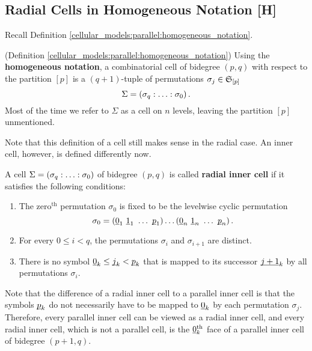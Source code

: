 \subsection{Radial Cells in Homogeneous Notation [H]}
\label{cellular_models:radial:cells_in_homogenous_notation}
Recall Definition \ref{cellular_models:parallel:homogeneous_notation}.

\begin{defi}(Definition \ref{cellular_models:parallel:homogeneous_notation})
\label{cellular_models:radial:homogeneous_notation}
Using the {\bf homogeneous notation}, a combinatorial cell of bidegree $(p,q)$ with respect to the partition $[p]$ is a $(q+1)$-tuple of permutations $\sigma_j \in \mathfrak S_{[p]}$
    \[
        \Sigma = \homogq \,.
    \]
    Most of the time we refer to $\Sigma$ as a cell on $n$ levels, leaving the partition $[p]$ unmentioned.
\end{defi}

Note that this definition of a cell still makes sense in the radial case.
An inner cell, however, is defined differently now.

\begin{defi}
\label{cellular_models:radial:inner_cells}
    A cell $\Sigma = \homogq$ of bidegree $(p,q)$ is called {\bf radial inner cell} if it satisfies the following conditions:
    \begin{enumerate}
        \item The zero${}^{\text{th}}$ permutation $\sigma_0$ is fixed to be the levelwise cyclic permutation 
              \[\sigma_0 = (\ul 0_1\ \ul 1_1\ \ldots\ \ul p_1)\ldots (\ul 0_n\ \ul 1_n\ \ldots\ \ul p_n)\,.\]
        \item For every $0 \le i < q$, the permutations $\sigma_i$ and $\sigma_{i+1}$ are distinct.
        \item There is no symbol $\underline{\smash{0}}_k \le \underline{\smash{j}}_k < \underline{\smash{p}}_k$ that is mapped to its successor $\underline{\smash{j+1}}_k$ by all permutations $\sigma_i$.
    \end{enumerate}
\end{defi}

Note that the difference of a radial inner cell to a parallel inner cell is 
that the symbols $\underline{\smash{p}}_k$ do not necessarily have to be mapped to $\underline{\smash{0}}_k$ by each permutation $\sigma_j$.
Therefore, every parallel inner cell can be viewed as a radial inner cell, 
and every radial inner cell, which is not a parallel cell, is the $\underline{\smash{0}}_k^{\text{th}}$ face of a parallel inner cell of bidegree $(p + 1, q)$.
 
